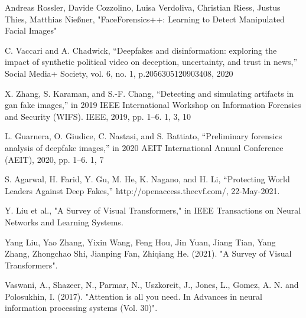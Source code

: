 \begin{thebibliography}{99}
        \item\label{ref1} Andreas Rossler, Davide Cozzolino, Luisa Verdoliva, Christian Riess, Justus Thies, Matthias Nießner, "FaceForensics++: Learning to Detect Manipulated Facial Images"

        \item\label{ref2} C. Vaccari and A. Chadwick, “Deepfakes and disinformation: exploring the impact of synthetic political video on deception, uncertainty, and trust in news,” Social Media+ Society, vol. 6, no. 1, p.2056305120903408, 2020
    
        \item\label{ref3} X. Zhang, S. Karaman, and S.-F. Chang, “Detecting and simulating artifacts in gan fake images,” in 2019 IEEE International Workshop on Information Forensics and Security (WIFS). IEEE, 2019, pp. 1–6. 1, 3, 10
    
        \item\label{ref4}  L. Guarnera, O. Giudice, C. Nastasi, and S. Battiato, “Preliminary forensics analysis of deepfake images,” in 2020 AEIT International Annual Conference (AEIT), 2020, pp. 1–6. 1, 7

        \item\label{ref5} S. Agarwal, H. Farid, Y. Gu, M. He, K. Nagano, and H. Li, “Protecting World 
    Leaders Against Deep Fakes,” http://openaccess.thecvf.com/,  22-May-2021.
    

    \item\label{ref6}Y. Liu et al., "A Survey of Visual Transformers," in IEEE Transactions on Neural Networks and Learning Systems.

    \item\label{ref7} Yang Liu, Yao Zhang, Yixin Wang, Feng Hou, Jin Yuan,
    Jiang Tian, Yang Zhang, Zhongchao Shi, Jianping Fan, Zhiqiang He. (2021). "A Survey of Visual Transformers".

    \item\label{ref8} Vaswani, A., Shazeer, N., Parmar, N., Uszkoreit, J., Jones, L., Gomez, A. N. and Polosukhin, I. (2017). "Attention is all you need. In Advances in neural information processing systems (Vol. 30)".


\end{thebibliography}
